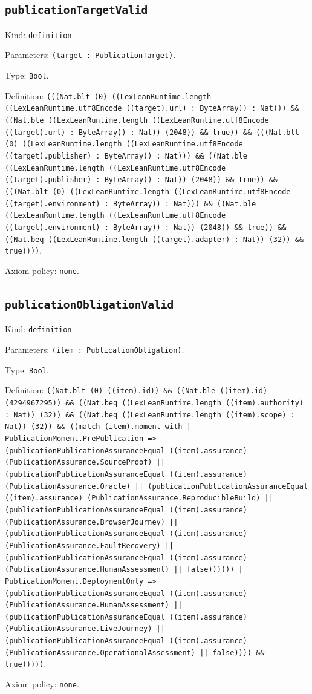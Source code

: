 \documentclass[11pt]{article}
\begin{document}
\subsection*{\texttt{publicationTargetValid}}
\noindent Kind: \texttt{definition}.\par
\noindent Parameters: \texttt{(target : PublicationTarget)}.\par
\noindent Type: \texttt{Bool}.\par
\noindent Definition: \texttt{(((Nat.blt (0) ((LexLeanRuntime.length ((LexLeanRuntime.utf8Encode ((target).url) : ByteArray)) : Nat))) \&\& ((Nat.ble ((LexLeanRuntime.length ((LexLeanRuntime.utf8Encode ((target).url) : ByteArray)) : Nat)) (2048)) \&\& true)) \&\& (((Nat.blt (0) ((LexLeanRuntime.length ((LexLeanRuntime.utf8Encode ((target).publisher) : ByteArray)) : Nat))) \&\& ((Nat.ble ((LexLeanRuntime.length ((LexLeanRuntime.utf8Encode ((target).publisher) : ByteArray)) : Nat)) (2048)) \&\& true)) \&\& (((Nat.blt (0) ((LexLeanRuntime.length ((LexLeanRuntime.utf8Encode ((target).environment) : ByteArray)) : Nat))) \&\& ((Nat.ble ((LexLeanRuntime.length ((LexLeanRuntime.utf8Encode ((target).environment) : ByteArray)) : Nat)) (2048)) \&\& true)) \&\& ((Nat.beq ((LexLeanRuntime.length ((target).adapter) : Nat)) (32)) \&\& true))))}.\par
\noindent Axiom policy: \texttt{none}.\par
\subsection*{\texttt{publicationObligationValid}}
\noindent Kind: \texttt{definition}.\par
\noindent Parameters: \texttt{(item : PublicationObligation)}.\par
\noindent Type: \texttt{Bool}.\par
\noindent Definition: \texttt{((Nat.blt (0) ((item).id)) \&\& ((Nat.ble ((item).id) (4294967295)) \&\& ((Nat.beq ((LexLeanRuntime.length ((item).authority) : Nat)) (32)) \&\& ((Nat.beq ((LexLeanRuntime.length ((item).scope) : Nat)) (32)) \&\& ((match (item).moment with | PublicationMoment.PrePublication => (publicationPublicationAssuranceEqual ((item).assurance) (PublicationAssurance.SourceProof) || (publicationPublicationAssuranceEqual ((item).assurance) (PublicationAssurance.Oracle) || (publicationPublicationAssuranceEqual ((item).assurance) (PublicationAssurance.ReproducibleBuild) || (publicationPublicationAssuranceEqual ((item).assurance) (PublicationAssurance.BrowserJourney) || (publicationPublicationAssuranceEqual ((item).assurance) (PublicationAssurance.FaultRecovery) || (publicationPublicationAssuranceEqual ((item).assurance) (PublicationAssurance.HumanAssessment) || false)))))) | PublicationMoment.DeploymentOnly => (publicationPublicationAssuranceEqual ((item).assurance) (PublicationAssurance.HumanAssessment) || (publicationPublicationAssuranceEqual ((item).assurance) (PublicationAssurance.LiveJourney) || (publicationPublicationAssuranceEqual ((item).assurance) (PublicationAssurance.OperationalAssessment) || false)))) \&\& true)))))}.\par
\noindent Axiom policy: \texttt{none}.\par
\end{document}

